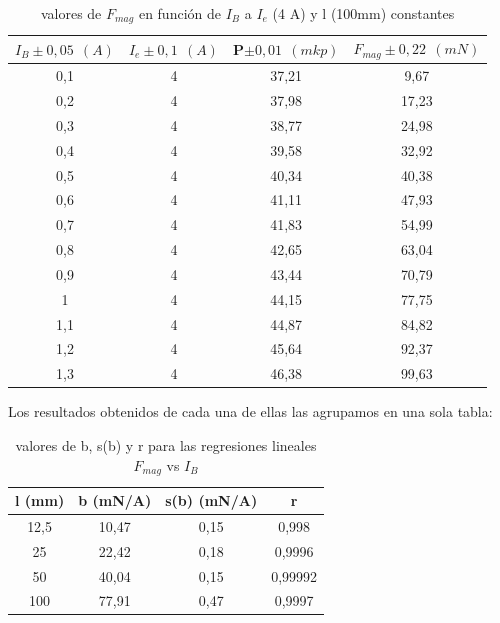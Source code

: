 \documentclass[12pt,a4paper]{book}
\begin{document}
\begin{table}[h!]
\begin{center}
\begin{tabular}{|c|c|c|c|}
\hline
$I_B  \pm 0,05 \ \  (A)$ & 	 $I_e \pm 0,1 \ \ (A) $ & 	 P$\pm 0,01\ \ (mkp)$ & 	 $F_{mag} \pm 0,22 \ \ (mN)$ \\ \hline
0,1 & 	 4 & 	 37,21 & 	 9,67 \\
0,2 & 	 4 & 	 37,98 & 	 17,23 \\
0,3 & 	 4 & 	 38,77 & 	 24,98 \\
0,4 & 	 4 & 	 39,58 & 	 32,92 \\
0,5 & 	 4 & 	 40,34 & 	 40,38 \\
0,6 & 	 4 & 	 41,11 & 	 47,93 \\
0,7 & 	 4 & 	 41,83 & 	 54,99 \\
0,8 & 	 4 & 	 42,65 & 	 63,04 \\
0,9 & 	 4 & 	 43,44 & 	 70,79 \\
1 & 	 4 & 	 44,15 & 	 77,75 \\
1,1 & 	 4 & 	 44,87 & 	 84,82 \\
1,2 & 	 4 & 	 45,64 & 	 92,37 \\
1,3 & 	 4 & 	 46,38 & 	 99,63 \\
\hline
\end{tabular}
\label{Tab: Fmag vs IB a l=100mm balanza}
\caption{valores de $F_{mag}$ en función de $I_B$ a $I_e$ (4 A) y l (100mm) constantes }
\end{center}
\end{table}

\newpage

Los resultados obtenidos de cada una de ellas las agrupamos en una sola tabla:

\begin{table}[h!]
\begin{center}
\begin{tabular}{|c|c|c|c|}
\hline
l  (mm) & 	 b  (mN/A) & 	 s(b) (mN/A) & 	 r \\  \hline
12,5 & 	 10,47 & 	 0,15 & 	 0,998\\ 
25 & 	 22,42 & 	 0,18 & 	 0,9996 \\ 
50 & 	 40,04 & 	 0,15 & 	 0,99992 \\ 
100 & 	 77,91 & 	 0,47 & 	 0,9997 \\  \hline
\end{tabular}
\caption{valores de b, s(b) y r para las regresiones lineales $F_{mag}$ vs $I_B$}
\label{Tab:balanza-valor-b-Ib}
\end{center}
\end{table}
\end{document}

